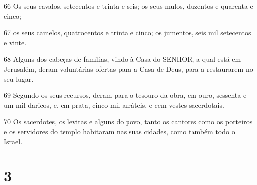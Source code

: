 \par 66 Os seus cavalos, setecentos e trinta e seis; os seus mulos, duzentos e quarenta e cinco;
\par 67 os seus camelos, quatrocentos e trinta e cinco; os jumentos, seis mil setecentos e vinte.
\par 68 Alguns dos cabeças de famílias, vindo à Casa do SENHOR, a qual está em Jerusalém, deram voluntárias ofertas para a Casa de Deus, para a restaurarem no seu lugar.
\par 69 Segundo os seus recursos, deram para o tesouro da obra, em ouro, sessenta e um mil daricos, e, em prata, cinco mil arráteis, e cem vestes sacerdotais.
\par 70 Os sacerdotes, os levitas e alguns do povo, tanto os cantores como os porteiros e os servidores do templo habitaram nas suas cidades, como também todo o Israel.

\chapter{3}

